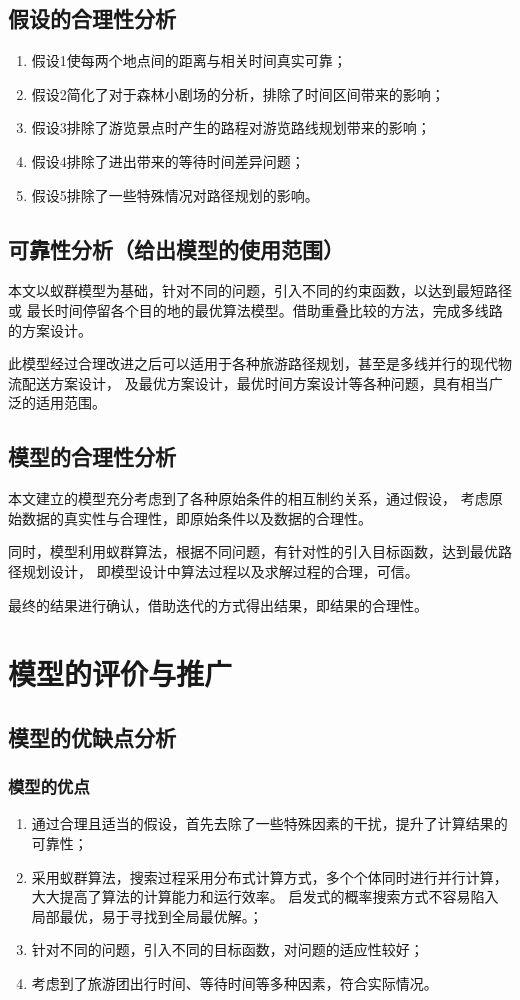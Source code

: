 \documentclass[hyperref,UTF8]{article}
\begin{document}
{\subsection{假设的合理性分析}
\begin{enumerate}
\item 假设1使每两个地点间的距离与相关时间真实可靠；
\item 假设2简化了对于森林小剧场的分析，排除了时间区间带来的影响；
\item 假设3排除了游览景点时产生的路程对游览路线规划带来的影响；
\item 假设4排除了进出带来的等待时间差异问题；
\item 假设5排除了一些特殊情况对路径规划的影响。
\end{enumerate}
\subsection{可靠性分析（给出模型的使用范围）}
本文以蚁群模型为基础，针对不同的问题，引入不同的约束函数，以达到最短路径或
最长时间停留各个目的地的最优算法模型。借助重叠比较的方法，完成多线路的方案设计。

此模型经过合理改进之后可以适用于各种旅游路径规划，甚至是多线并行的现代物流配送方案设计，
及最优方案设计，最优时间方案设计等各种问题，具有相当广泛的适用范围。

\subsection{模型的合理性分析}
本文建立的模型充分考虑到了各种原始条件的相互制约关系，通过假设，
考虑原始数据的真实性与合理性，即原始条件以及数据的合理性。

同时，模型利用蚁群算法，根据不同问题，有针对性的引入目标函数，达到最优路径规划设计，
即模型设计中算法过程以及求解过程的合理，可信。

最终的结果进行确认，借助迭代的方式得出结果，即结果的合理性。




\section{模型的评价与推广}
\subsection{模型的优缺点分析}
\subsubsection{模型的优点}
\begin{enumerate}
\item 通过合理且适当的假设，首先去除了一些特殊因素的干扰，提升了计算结果的可靠性；
\item 采用蚁群算法，搜索过程采用分布式计算方式，多个个体同时进行并行计算，大大提高了算法的计算能力和运行效率。
启发式的概率搜索方式不容易陷入局部最优，易于寻找到全局最优解。；
\item 针对不同的问题，引入不同的目标函数，对问题的适应性较好；
\item 考虑到了旅游团出行时间、等待时间等多种因素，符合实际情况。
\end{enumerate}
}
\end{document}
